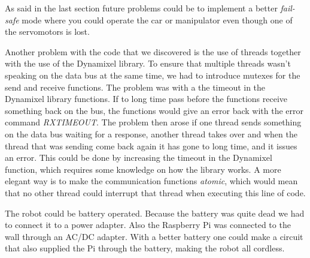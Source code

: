 As said in the last section future problems could be to implement a better \textit{fail-safe} mode where you could operate the car or manipulator even though one of the servomotors is lost.
\bigskip

Another problem with the code that we discovered is the use of threads together with the use of the Dynamixel library. To ensure that multiple threads wasn't speaking on the data bus at the same time, we had to introduce mutexes for the send and receive functions. The problem was with a the timeout in the Dynamixel library functions. If to long time pass before the functions receive something back on the bus, the functions would give an error back with the error command \textit{RXTIMEOUT}. The problem then arose if one thread sends something on the data bus waiting for a response, another thread takes over and when the thread that was sending come back again it has gone to long time, and it issues an error. This could be done by increasing the timeout in the Dynamixel function, which requires some knowledge on how the library works. 
A more elegant way is to make the communication functions \textit{atomic}, which would mean that no other thread could interrupt that thread when executing this line of code. %
\bigskip

The robot could be battery operated. Because the battery was quite dead we had to connect it to a power adapter. Also the Raspberry Pi was connected to the wall through an AC/DC adapter. With a better battery one could make a circuit that also supplied the Pi through the battery, making the robot all cordless.



